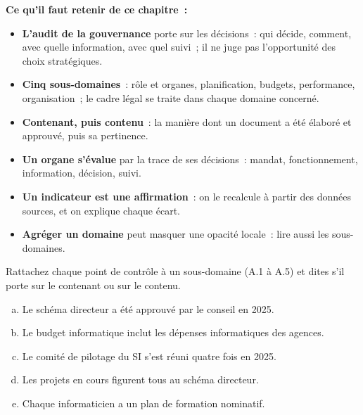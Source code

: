 \begin{boxresume}
\textbf{Ce qu'il faut retenir de ce chapitre~:}
\begin{itemize}
    \item \textbf{L'audit de la gouvernance} porte sur les décisions~: qui
          décide, comment, avec quelle information, avec quel suivi~; il ne
          juge pas l'opportunité des choix stratégiques.
    \item \textbf{Cinq sous-domaines}~: rôle et organes, planification,
          budgets, performance, organisation~; le cadre légal se traite
          dans chaque domaine concerné.
    \item \textbf{Contenant, puis contenu}~: la manière dont un document a
          été élaboré et approuvé, puis sa pertinence.
    \item \textbf{Un organe s'évalue} par la trace de ses décisions~:
          mandat, fonctionnement, information, décision, suivi.
    \item \textbf{Un indicateur est une affirmation}~: on le recalcule à
          partir des données sources, et on explique chaque écart.
    \item \textbf{Agréger un domaine} peut masquer une opacité locale~:
          lire aussi les sous-domaines.
\end{itemize}
\end{boxresume}

\bigskip

\begin{boxexo}[title={\ding{45}\quad Exercice~13.1. Classer les points de contrôle \niveaubase}]
Rattachez chaque point de contrôle à un sous-domaine (A.1 à A.5) et dites
s'il porte sur le contenant ou sur le contenu.
\begin{enumerate}[(a)]
    \item Le schéma directeur a été approuvé par le conseil en 2025.
    \item Le budget informatique inclut les dépenses informatiques des
          agences.
    \item Le comité de pilotage du SI s'est réuni quatre fois en 2025.
    \item Les projets en cours figurent tous au schéma directeur.
    \item Chaque informaticien a un plan de formation nominatif.
\end{enumerate}
\end{boxexo}


